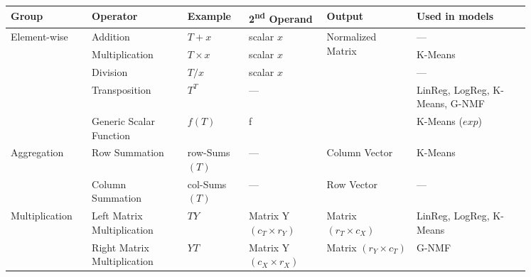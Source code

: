 \begin{tabular}{p{0.12\linewidth}p{0.16\linewidth}p{0.1\linewidth}p{0.13\linewidth}p{0.15\linewidth}p{0.19\linewidth}}
\toprule
Group & Operator & Example & 2\textsuperscript{nd} Operand & Output & Used in models \\
\midrule\midrule
\multirow[t]{5}{*}{\parbox{1\linewidth}{\vspace{2.3cm}\hspace{0pt}Element-wise}} & Addition & $T + x$ & scalar $x$ & \multirow[t]{5}{*}{\parbox{1\linewidth}{\vspace{2.3cm}Normalized Matrix}} & — \\

 & Multiplication & $T \times x$ & scalar $x$ &  & K-Means \\

 & Division & $T / x$ & scalar $x$ &  & — \\

 & Transposition & $T^T$ & — &  & LinReg, LogReg, K-Means, G-NMF \\

 & Generic Scalar Function & $f(T)$ & f &  & K-Means ($exp$) \\
\cline{1-6}
\multirow[t]{2}{*}{\parbox{1\linewidth}{\vspace{1.3cm}\hspace{0pt}Aggregation}} & Row Summation & \hspace{0pt} row-Sums$(T)$ & — & Column Vector & K-Means \\

 & Column Summation & \hspace{0pt} col-Sums$(T)$ & — & Row Vector & — \\
\cline{1-6}
\multirow[t]{2}{*}{\parbox{1\linewidth}{\vspace{1.3cm}\hspace{0pt}Multiplication}} & Left Matrix Multiplication & $T Y$ & Matrix Y $(c_T \times r_Y)$ & Matrix $(r_T \times c_X)$ & LinReg, LogReg, K-Means \\

 & Right Matrix Multiplication & $Y T$ & Matrix Y $(c_X \times r_X)$ & Matrix $(r_Y \times c_T)$ & G-NMF \\
\cline{1-6}
\bottomrule
\end{tabular}
